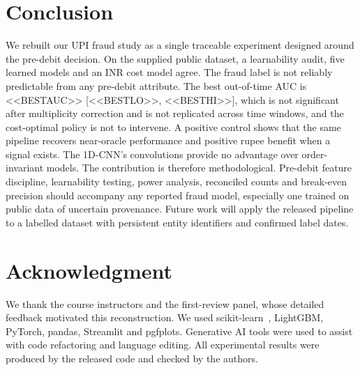 \documentclass[conference]{IEEEtran}
\begin{document}
\section{Conclusion}
We rebuilt our UPI fraud study as a single traceable experiment designed around the pre-debit decision. On the supplied public dataset, a learnability audit, five learned models and an INR cost model agree. The fraud label is not reliably predictable from any pre-debit attribute. The best out-of-time AUC is <<BESTAUC>> [<<BESTLO>>, <<BESTHI>>], which is not significant after multiplicity correction and is not replicated across time windows, and the cost-optimal policy is not to intervene. A positive control shows that the same pipeline recovers near-oracle performance and positive rupee benefit when a signal exists. The 1D-CNN's convolutions provide no advantage over order-invariant models. The contribution is therefore methodological. Pre-debit feature discipline, learnability testing, power analysis, reconciled counts and break-even precision should accompany any reported fraud model, especially one trained on public data of uncertain provenance. Future work will apply the released pipeline to a labelled dataset with persistent entity identifiers and confirmed label dates.

\section*{Acknowledgment}
We thank the course instructors and the first-review panel, whose detailed feedback motivated this reconstruction. We used scikit-learn~\cite{pedregosa2011}, LightGBM, PyTorch, pandas, Streamlit and pgfplots. Generative AI tools were used to assist with code refactoring and language editing. All experimental results were produced by the released code and checked by the authors.
\end{document}
